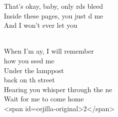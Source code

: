 \begin{cancion}[Photograph][Ed Sheeran]
\begin{chorus}
	That's okay, baby, only rds bleed\\
	Inside these pages, you just d me\\
	And I won't ever let you \\
	\end{chorus}%
	\jump\\
	When I'm ay, I will remember \\
	how you ssed me\\
Under the lamppost \\
	back on th street\\
	Hearing you whisper through the ne\\
Wait for me to come home\\
<span id=cejilla-original>2</span>\\
\end{cancion}%
